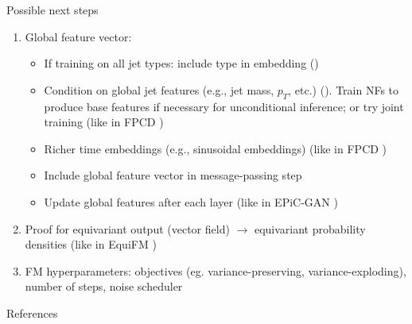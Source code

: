 \documentclass[handout, aspectratio=169,xcolor=dvipsnames]{beamer}
\begin{document}
\begin{frame}{Possible next steps}
    \begin{enumerate}
        \item Global feature vector: \begin{itemize}
            \item If training on all jet types: include type in embedding (\cite{leighFasterDiffusionModel2024})
            \item Condition on global jet features (e.g., jet mass, $p_T$, etc.) (\cite{leighPCJeDiDiffusionParticle2024,kachJetFlowGeneratingJets2022,mikuniFastPointCloud2023,leighFasterDiffusionModel2024,buhmannEPiClyFastParticle2023}). Train NFs to produce base features if necessary for unconditional inference; or try joint training (like in FPCD \cite{mikuniFastPointCloud2023})
            \item Richer time embeddings (e.g., sinusoidal embeddings) (like in FPCD \cite{mikuniFastPointCloud2023})
            \item Include global feature vector in message-passing step
            \item Update global features after each layer (like in EPiC-GAN \cite{buhmannEPiCGANEquivariantPoint2023})
        \end{itemize}
        \item Proof for equivariant output (vector field) $\to$ equivariant probability densities (like in EquiFM \cite{songEquivariantFlowMatching2023})
        \item FM hyperparameters: objectives (eg. variance-preserving, variance-exploding), number of steps, noise scheduler
    \end{enumerate}
\end{frame}


\begin{frame}[allowframebreaks]{References}
\printbibliography
\end{frame}
\end{document}
